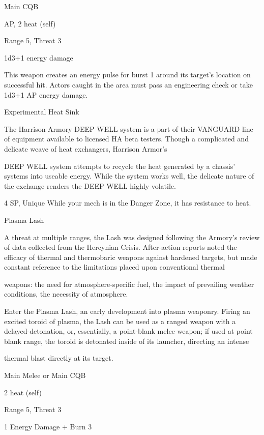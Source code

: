 Main CQB
 
AP, 2 heat (self)
 
Range 5, Threat 3
 
1d3+1 energy damage
 
This weapon creates an energy pulse for burst 1 around its target’s location on successful hit.  
Actors caught in the area must pass an engineering check or take 1d3+1 AP energy damage.
 

Experimental Heat Sink  

The Harrison Armory DEEP WELL system is a part of their VANGUARD line of equipment available to  
licensed HA beta testers. Though a complicated and delicate weave of heat exchangers, Harrison Armor’s  

DEEP WELL system attempts to recycle the heat generated by a chassis’ systems into useable energy.  
While the system works well, the delicate nature of the exchange renders the DEEP WELL highly volatile.    

4 SP, Unique  
While your mech is in the Danger Zone, it has resistance to heat.
 

Plasma Lash  

A threat at multiple ranges, the Lash was designed following the Armory’s review of data collected from the  
Hercynian Crisis. After-action reports noted the efficacy of thermal and thermobaric weapons against  
hardened targets, but made constant reference to the limitations placed upon conventional thermal  

weapons: the need for atmosphere-specific fuel, the impact of prevailing weather conditions, the necessity  
of atmosphere.   

Enter the Plasma Lash, an early development into plasma weaponry. Firing an excited toroid of plasma, the  
Lash can be used as a ranged weapon with a delayed-detonation, or, essentially, a point-blank melee  
weapon; if used at point blank range, the toroid is detonated inside of its launcher, directing an intense  

thermal blast directly at its target.  

Main Melee or Main CQB
 
2 heat (self)
 
Range 5, Threat 3
 
1 Energy Damage + Burn 3
 

                                                                                                                     


